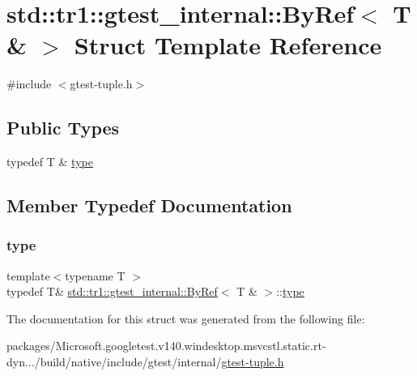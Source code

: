\hypertarget{structstd_1_1tr1_1_1gtest__internal_1_1_by_ref_3_01_t_01_6_01_4}{}\section{std\+::tr1\+::gtest\+\_\+internal\+::By\+Ref$<$ T \& $>$ Struct Template Reference}
\label{structstd_1_1tr1_1_1gtest__internal_1_1_by_ref_3_01_t_01_6_01_4}


{\ttfamily \#include $<$gtest-\/tuple.\+h$>$}

\subsection*{Public Types}
\begin{DoxyCompactItemize}
\item 
typedef T \& \mbox{\hyperlink{structstd_1_1tr1_1_1gtest__internal_1_1_by_ref_3_01_t_01_6_01_4_a512382574dbdd736320d68e313801122}{type}}
\end{DoxyCompactItemize}


\subsection{Member Typedef Documentation}
\mbox{\label{structstd_1_1tr1_1_1gtest__internal_1_1_by_ref_3_01_t_01_6_01_4_a512382574dbdd736320d68e313801122}} 
\subsubsection{\texorpdfstring{type}{type}}
{\footnotesize\ttfamily template$<$typename T $>$ \\
typedef T\& \mbox{\hyperlink{structstd_1_1tr1_1_1gtest__internal_1_1_by_ref}{std\+::tr1\+::gtest\+\_\+internal\+::\+By\+Ref}}$<$ T \& $>$\+::\mbox{\hyperlink{structstd_1_1tr1_1_1gtest__internal_1_1_by_ref_3_01_t_01_6_01_4_a512382574dbdd736320d68e313801122}{type}}}



The documentation for this struct was generated from the following file\+:\begin{DoxyCompactItemize}
\item 
packages/\+Microsoft.\+googletest.\+v140.\+windesktop.\+msvcstl.\+static.\+rt-\/dyn.../build/native/include/gtest/internal/\mbox{\hyperlink{gtest-tuple_8h}{gtest-\/tuple.\+h}}\end{DoxyCompactItemize}
